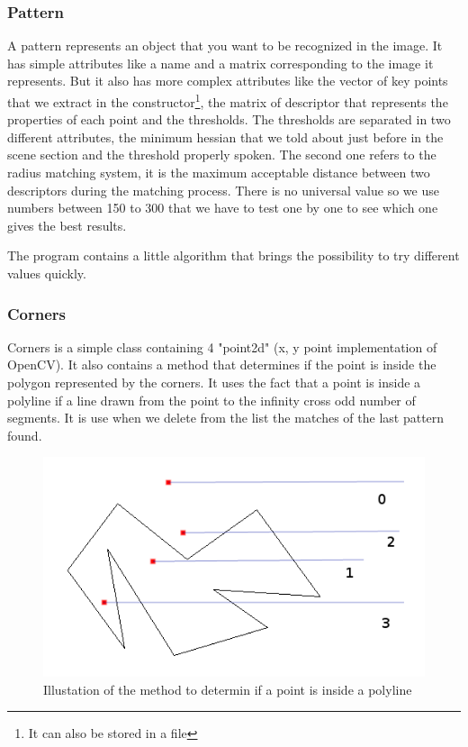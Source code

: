 \documentclass[english,a4paper,11pt]{report}
\begin{document}
	\subsubsection{Pattern}
	\par A pattern represents an object that you want to be recognized in the image. It has simple attributes like a name and a matrix corresponding to the image it represents. But it also has more complex attributes like the vector of key points that we extract in the constructor\footnote{It can also be stored in a file}, the matrix of descriptor that represents the properties of each point and the thresholds. The thresholds are separated in two different attributes, the minimum hessian that we told about just before in the scene section and the threshold properly spoken. The second one refers to the radius matching system, it is the maximum acceptable distance between two descriptors during the matching process. There is no universal value so we use numbers between 150 to 300 that we have to test one by one to see which one gives the best results.
 \par The program contains a little algorithm that brings the possibility to try different values quickly.
	
	
	\subsubsection{Corners}
	\par Corners is a simple class containing 4 "point2d" (x, y point implementation of OpenCV).
It also contains a method that determines if the point is inside the polygon represented by the corners. It uses the fact that a point is inside a polyline if a line drawn from the point to the infinity cross odd number of segments. It is use when we delete from the list the matches of the last pattern found.
	\begin{figure}[h]
		\begin{center}
			\includegraphics[scale=0.7]{images_not_compressed/isIn.png}
			\caption{Illustation of the method to determin if a point is inside a polyline}
		\end{center}
	\end{figure}


	\listoffigures

	{}
	
	
\end{document}

